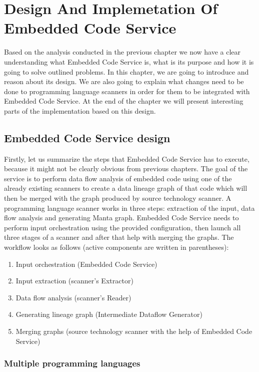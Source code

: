 \chapter{Design And Implemetation Of Embedded Code Service}

Based on the analysis conducted in the previous chapter we now have a clear understanding what Embedded Code Service is, what is its purpose and how it is going to solve outlined problems. In this chapter, we are going to introduce and reason about its design. We are also going to explain what changes need to be done to programming language scanners in order for them to be integrated with Embedded Code Service. At the end of the chapter we will present interesting parts of the implementation based on this design.

\section{Embedded Code Service design}

Firstly, let us summarize the steps that Embedded Code Service has to execute, because it might not be clearly obvious from previous chapters. The goal of the service is to perform data flow analysis of embedded code using one of the already existing scanners to create a data lineage graph of that code which will then be merged with the graph produced by source technology scanner. A programming language scanner works in three steps: extraction of the input, data flow analysis and generating Manta graph. Embedded Code Service needs to perform input orchestration using the provided configuration, then launch all three stages of a scanner and after that help with merging the graphs. The workflow looks as follows (active components are written in parentheses):
\begin{enumerate}
    \item Input orchestration (Embedded Code Service)
    \item Input extraction (scanner's Extractor)
    \item Data flow analysis (scanner's Reader)
    \item Generating lineage graph (Intermediate Dataflow Generator)
    \item Merging graphs (source technology scanner with the help of Embedded Code Service)
\end{enumerate}

\subsection{Multiple programming languages}

